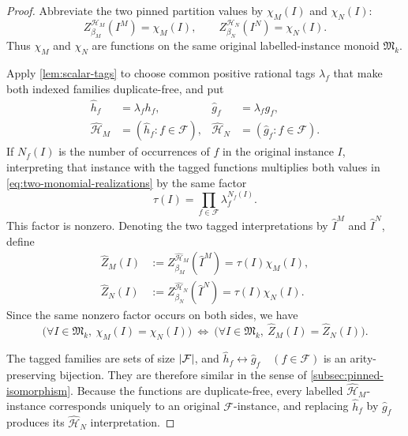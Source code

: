 \documentclass[11pt,letterpaper,onecolumn]{article}
\theoremstyle{plain}
\theoremstyle{definition}
\theoremstyle{remark}
\newcommand{\cF}{\mathcal F}
\newcommand{\InstMonoid}[1]{\mathfrak M_{#1}}
\DeclarePairedDelimiter{\abs}{\lvert}{\rvert}
\begin{document}
\begin{proof}
Abbreviate the two pinned partition values by $\chi_M(I)$ and $\chi_N(I)$:
\begin{equation}
 Z_{\beta_M}^{\mathcal H_M}(I^M)=\chi_M(I),\qquad
 Z_{\beta_N}^{\mathcal H_N}(I^N)=\chi_N(I).
 \label{eq:two-monomial-realizations}
\end{equation}
Thus $\chi_M$ and $\chi_N$ are functions on the same original
labelled-instance monoid $\InstMonoid{k}$.

Apply
\cref{lem:scalar-tags} to choose common positive rational tags $\lambda_f$
that make both indexed families duplicate-free, and put
\[
\begin{aligned}
  \widehat h_f&=\lambda_fh_f,
  &\widehat g_f&=\lambda_fg_f,\\
  \widehat{\mathcal H}_M&=(\widehat h_f:f\in\cF),
  &\widehat{\mathcal H}_N&=(\widehat g_f:f\in\cF).
\end{aligned}
\]
If $N_f(I)$ is
the number of occurrences of $f$ in the original instance $I$, interpreting
that instance with the tagged functions multiplies both values in
\eqref{eq:two-monomial-realizations} by the same factor
\begin{equation*}
  \tau(I)=\prod_{f\in\cF}\lambda_f^{N_f(I)}.
\end{equation*}
This factor is nonzero.  Denoting the two tagged interpretations by
$\widehat I^M$ and $\widehat I^N$, define
\begin{align*}
  \widehat Z_M(I)
  &:=Z_{\beta_M}^{\widehat{\mathcal H}_M}(\widehat I^M)
    =\tau(I)\chi_M(I),\\
  \widehat Z_N(I)
  &:=Z_{\beta_N}^{\widehat{\mathcal H}_N}(\widehat I^N)
    =\tau(I)\chi_N(I).
\end{align*}
Since the same nonzero factor occurs on both sides, we have
\begin{equation}
  \bigl(\forall I\in\InstMonoid{k},\ \chi_M(I)=\chi_N(I)\bigr)
  \ \Longleftrightarrow\ 
  \bigl(\forall I\in\InstMonoid{k},\ \widehat Z_M(I)=\widehat Z_N(I)\bigr).
  \label{eq:character-agreement-tagged-agreement}
\end{equation}

The tagged families are sets of size $\abs{\cF}$, and
$\widehat h_f\longleftrightarrow\widehat g_f \quad(f\in\cF)$ is an
arity-preserving bijection.  They are therefore similar in the sense of
\cref{subsec:pinned-isomorphism}.  Because the
functions are duplicate-free, every labelled
$\widehat{\mathcal H}_M$-instance corresponds uniquely to an original
$\cF$-instance, and replacing $\widehat h_f$ by
$\widehat g_f$ produces its $\widehat{\mathcal H}_N$ interpretation.


\end{proof}
\end{document}
